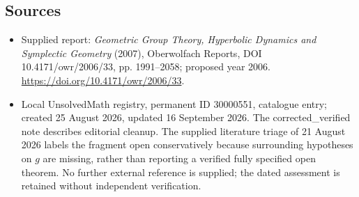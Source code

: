 \documentclass[11pt]{article}
\begin{document}
\subsection{Sources}
\begin{itemize}
\item Supplied report: \emph{Geometric Group Theory, Hyperbolic Dynamics and Symplectic Geometry} (2007), Oberwolfach Reports, DOI 10.4171/owr/2006/33, pp. 1991--2058; proposed year 2006. \url{https://doi.org/10.4171/owr/2006/33}.
\item Local UnsolvedMath registry, permanent ID 30000551, catalogue entry; created 25 August 2026, updated 16 September 2026. The corrected\_verified note describes editorial cleanup. The supplied literature triage of 21 August 2026 labels the fragment open conservatively because surrounding hypotheses on $g$ are missing, rather than reporting a verified fully specified open theorem. No further external reference is supplied; the dated assessment is retained without independent verification.
\end{itemize}
\end{document}
